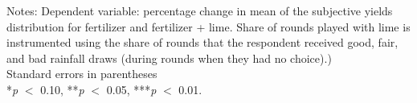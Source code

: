 \begin{table}[htbp]
\begin{threeparttable}
\begin{tabular}{l cc}
\hline
\hline
\end{tabular}
\begin{tablenotes}
\footnotesize
\item{Notes: Dependent variable: percentage change in mean of the subjective yields distribution for fertilizer and fertilizer + lime. Share of rounds played with lime is instrumented using the share of rounds that the respondent received good, fair, and bad rainfall draws (during rounds when they had no choice).) \\ Standard errors in parentheses \\ *\textit{p} $<$ 0.10, **\textit{p} $<$ 0.05, ***\textit{p} $<$ 0.01.}
\end{tablenotes}
\end{threeparttable}
\end{table}
